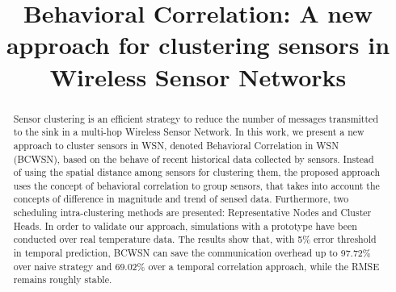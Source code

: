 \documentclass[conference]{IEEEtran}
\begin{document}
%

\title{Behavioral Correlation: A new approach for clustering sensors in Wireless Sensor Networks}

\author{
\and
{}
\and
{}
}


\maketitle


\begin{abstract}

Sensor clustering is an efficient strategy to reduce the number of messages
transmitted to the sink in a multi-hop Wireless Sensor Network.
In this work, we present a new approach to cluster sensors in WSN, denoted
Behavioral Correlation in WSN (BCWSN), based on the behave of recent historical
data collected by sensors. Instead of using the spatial distance among sensors
for clustering them, the proposed approach uses the concept of behavioral
correlation to group sensors, that takes into account the concepts of difference
in magnitude and trend of sensed data.
Furthermore, two scheduling intra-clustering methods are presented:
Representative Nodes and Cluster Heads.
In order to validate our approach, simulations with a prototype have been
conducted over real temperature data. The results show that, with 5\% error
threshold in temporal prediction, BCWSN can save the communication overhead up
to 97.72\% over naive strategy and 69.02\% over a temporal correlation approach,
while the RMSE remains roughly stable.



\end{abstract}
\end{document}
